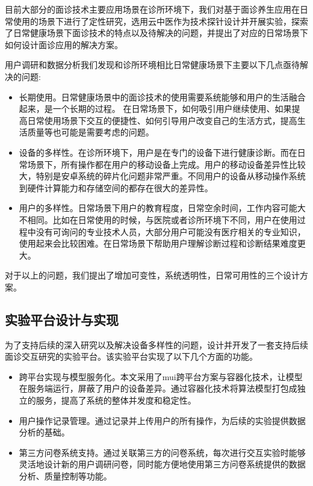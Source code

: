 目前大部分的面诊技术主要应用场景在诊所环境下，我们对基于面诊养生应用在日常使用的场景下进行了定性研究，选用云中医作为技术探针设计并开展实验，探索了日常健康场景下面诊技术的特点以及待解决的问题，并提出了对应的日常场景下如何设计面诊应用的解决方案。

用户调研和数据分析我们发现和诊所环境相比日常健康场景下主要以下几点亟待解决的问题: 

\begin{itemize}
    
    \item 长期使用。日常健康场景中的面诊技术的使用需要系统能够和用户的生活融合起来，是一个长期的过程。 在日常场景下，如何吸引用户继续使用、如果提高日常使用场景下交互的便捷性、如何引导用户改变自己的生活方式，提高生活质量等也可能是需要考虑的问题。

    \item 设备的多样性。在诊所环境下，用户是在专门的设备下进行健康诊断。而在日常场景下，所有操作都在用户的移动设备上完成。用户的移动设备差异性比较大，特别是安卓系统的碎片化问题非常严重。不同用户的设备从移动操作系统到硬件计算能力和存储空间的都存在很大的差异性。
    
    \item 用户的多样性。日常场景下用户的教育程度，日常空余时间，工作内容可能大不相同。比如在日常使用的时候，与医院或者诊所环境下不同，用户在使用过程中没有可询问的专业技术人员，大部分用户可能没有医疗相关的专业知识，使用起来会比较困难。在日常场景下帮助用户理解诊断过程和诊断结果难度更大。

\end{itemize}

对于以上的问题，我们提出了增加可变性，系统透明性，日常可用性的三个设计方案。

\subsection{实验平台设计与实现}

为了支持后续的深入研究以及解决设备多样性的问题，设计并开发了一套支持后续面诊交互研究的实验平台。该实验平台实现了以下几个方面的功能。

\begin{itemize}

    \item 跨平台实现与模型服务化。本文采用了mui跨平台方案与容器化技术，让模型在服务端运行，屏蔽了用户的设备差异。通过容器化技术将算法模型打包成独立的服务，提高了系统的整体并发度和稳定性。

    \item 用户操作记录管理。通过记录并上传用户的所有操作，为后续的实验提供数据分析的基础。

    \item 第三方问卷系统支持。通过关联第三方的问卷系统，每次进行交互实验时能够灵活地设计新的用户调研问卷，同时能方便地使用第三方问卷系统提供的数据分析、质量控制等功能。

\end{itemize}

